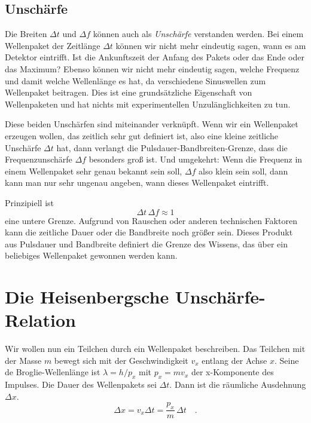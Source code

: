 \subsection{Unschärfe}

Die Breiten $\Delta t$ und $\Delta f$ können auch als \emph{Unschärfe} verstanden werden. Bei einem Wellenpaket der Zeitlänge $\Delta t$ können wir nicht mehr eindeutig sagen, wann es am Detektor eintrifft. Ist die Ankunftszeit der Anfang des Pakets oder das Ende oder das Maximum? Ebenso können wir nicht mehr eindeutig sagen, welche Frequenz und damit welche Wellenlänge es hat, da verschiedene Sinuswellen zum Wellenpaket beitragen. Dies ist eine grundsätzliche Eigenschaft von Wellenpaketen und hat nichts mit experimentellen Unzulänglichkeiten zu tun.

Diese beiden Unschärfen sind miteinander verknüpft. Wenn wir ein Wellenpaket erzeugen wollen, das zeitlich sehr gut definiert ist, also eine kleine zeitliche Unschärfe $\Delta t$ hat, dann verlangt die Pulsdauer-Bandbreiten-Grenze, dass die Frequenzunschärfe $\Delta f$ besonders groß ist. Und umgekehrt: Wenn die Frequenz in einem Wellenpaket sehr genau bekannt sein soll, $\Delta f$ also klein sein soll, dann kann man nur sehr ungenau angeben, wann dieses Wellenpaket eintrifft.

Prinzipiell ist 
\begin{equation}
    \Delta t \, \Delta f \approx 1
\end{equation}
eine untere Grenze. Aufgrund von Rauschen oder anderen technischen Faktoren kann die zeitliche Dauer oder die Bandbreite noch größer sein. Dieses Produkt aus Pulsdauer und Bandbreite definiert die Grenze des Wissens, das über ein beliebiges Wellenpaket gewonnen werden kann.


\section{Die Heisenbergsche Unschärfe-Relation}

Wir wollen nun ein Teilchen durch ein Wellenpaket beschreiben. Das Teilchen mit der Masse $m$ bewegt sich mit der Geschwindigkeit $v_x$ entlang der Achse $x$. Seine de Broglie-Wellenlänge ist $\lambda = h / p_x$ mit $p_x = m v_x$ der x-Komponente des Impulses. Die Dauer des Wellenpakets sei $\Delta t$. Dann ist die räumliche Ausdehnung $\Delta x$.
\begin{equation}
    \Delta x = v_x \Delta t = \frac{p_x}{m} \, \Delta t \quad .
\end{equation}

